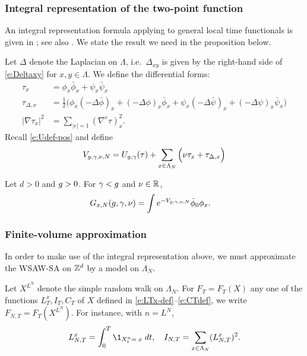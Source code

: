 \subsubsection{Integral representation of the two-point function}
\label{sec:Gintrep}

An integral representation formula applying to general local time functionals
is given in \cite{BEI92,BIS09}; see also \cite[Appendix~A]{ST-phi4}.
We state the result we need in the proposition below.

Let $\Delta$ denote the Laplacian on $\Lambda$,
i.e.\ $\Delta_{xy}$ is given by the right-hand side of
\eqref{e:Deltaxy} for $x, y \in \Lambda$.
We define the differential forms:
\begin{align}
\label{e:taudef}
\tau_x
	&=
\phi_x \bar\phi_x + \psi_x \bar\psi_x
	\\
\label{e:addDelta}
\tau_{\Delta,x}
	&=
\frac 12
\Big(
	\phi_{x} (- \Delta \bar{\phi})_{x} + (- \Delta \phi)_{x} \bar{\phi}_{x}
		+
	\psi_{x}  (- \Delta \bar{\psi})_{x} + (- \Delta \psi)_{x}  \bar{\psi}_{x}
\Big)
	\\
\label{e:nablatau}
|\nabla \tau_x|^2
	&=
\sum_{|e|=1} (\nabla^e \tau)_x^2.
\end{align}
Recall \eqref{e:Udef-pos} and define
\begin{equation}
\label{e:Vdef2}
V_{g,\gamma,\nu,N}
	=
U_{g,\gamma}(\tau)
	+
\sum_{x\in\Lambda_N}
\Big(
	\nu \tau_x + \tau_{\Delta,x}
\Big)
\end{equation}

\begin{prop}
Let $d > 0$ and $g > 0$. For $\gamma < g$ and $\nu \in {\mathbb R}$,
\begin{align}
\label{e:Grep-pos-bis}
G_{x,N}(g, \gamma, \nu)
	&=
\int e^{-V_{g,\gamma,\nu,N}} \bar\phi_0 \phi_x.
\end{align}
\end{prop}

\subsubsection{Finite-volume approximation}

In order to make use of the integral representation above, we must approximate the
WSAW-SA on ${ {{\mathbb Z}}^d }$ by a model on $\Lambda_N$.

Let $X^{L^N}$ denote the simple random walk on $\Lambda_N$.
For $F_T = F_T(X)$ any one of the functions $L_T^x,I_T,C_T$
of $X$ defined in \eqref{e:LTx-def}--\eqref{e:CTdef},
we write $F_{N,T} = F_T(X^{L^N})$. For instance, with $n=L^N$,
\begin{equation}
    L^x_{N,T} = \int_0^T \1_{X^{n}_t=\;x} \; dt,
    \quad I_{N,T} = \sum_{x \in \Lambda_N}(L_{N,T}^x)^2 .
\end{equation}

